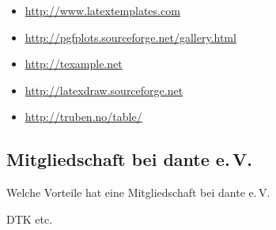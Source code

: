 
\begin{itemize}
    \item \url{http://www.latextemplates.com}
    \item \url{http://pgfplots.sourceforge.net/gallery.html}
    \item \url{http://texample.net}
\end{itemize}
    


\begin{itemize}
    \item \url{http://latexdraw.sourceforge.net}
    \item \url{http://truben.no/table/}
\end{itemize}


\subsection{Mitgliedschaft bei dante e.\,V.}
Welche Vorteile hat eine Mitgliedschaft bei
dante e.\,V.

DTK etc.
